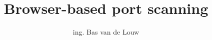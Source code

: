 \documentclass{ou-report}
\begin{document}
\newcommand{\todo}[1]{{\color{red} #1}}
\pagestyle{plain}
\title{Browser-based port scanning}
\author{ing. Bas van de Louw}
%



\frontmatter 


\let\cleardoublepage\clearpage

%

%




%
%






\tableofcontents

\mainmatter{}



















% 
\end{document}
